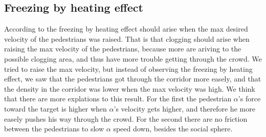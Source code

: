 \subsection{Freezing by heating effect}
According to \cite{self-org} the freezing by heating effect should arise when the max desired velocity of the pedestrians was raised.
That is that clogging should arise when raising the max velocity of the pedestrians, because more are ariving to the possible
clogging area, and thus have more trouble getting through the crowd. 
We tried to raise the max velocity, but instead of observing the freezing by heating effect, we saw that the pedestrians
got through the corridor more easely, and that the density in the corridor was lower when the max velocity was high.
We think that there are more explations to this result. For the first the pedestrian $\alpha$'s force toward the target
is higher when $\alpha$'s velocity gets higher, and therefore he more easely pushes his way through the crowd. For the second
there are no friction between the pedestrians to slow $\alpha$ speed down, besides the social sphere.